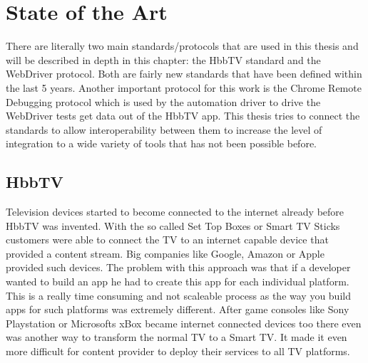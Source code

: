 %
%

\chapter{State of the Art\label{cha:state_of_the_art}}

There are literally two main standards/protocols that are used in this thesis and will be described in
depth in this chapter: the HbbTV standard and the WebDriver protocol. Both are fairly new standards that
have been defined within the last 5 years. Another important protocol for this work is the Chrome Remote
Debugging protocol which is used by the automation driver to drive the WebDriver tests get data out of
the HbbTV app. This thesis tries to connect the standards to allow interoperability between them to
increase the level of integration to a wide variety of tools that has not been possible before.

\section{HbbTV\label{sec:hbbtv}}


Television devices started to become connected to the internet already before HbbTV was invented. With
the so called Set Top Boxes or Smart TV Sticks customers were able to connect the TV to an internet
capable device that provided a content stream. Big companies like Google, Amazon or Apple provided such
devices. The problem with this approach was that if a developer wanted to build an app he had to create
this app for each individual platform. This is a really time consuming and not scaleable process as
the way you build apps for such platforms was extremely different. After game consoles like Sony Playstation
or Microsofts xBox became internet connected devices too there even was another way to transform
the normal TV to a Smart TV. It made it even more difficult for content provider to deploy their services
to all TV platforms.

